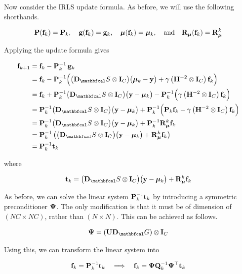 Now consider the IRLS update formula. As before, we will use the following shorthands. 

\begin{equation*}
    \mathbf{P}(\mathbf{f}_k) = \mathbf{P}_k, \quad \mathbf{g}(\mathbf{f}_k) = \mathbf{g}_k, \quad \boldsymbol{\mu}(\mathbf{f}_k) = \boldsymbol{\mu}_k, \quad \text{and} \quad \mathbf{R}_{\boldsymbol{\mu}}(\mathbf{f}_k) = \mathbf{R}_{\boldsymbol{\mu}}^k
\end{equation*}

Applying the update formula gives

\begin{align*}
    \f_{k+1} &= \f_k - \PP^{-1}_k \, \g_k\\
    &= \f_{k} - \PP^{-1}_k \Big(\big(\D_\St \otimes \I_C\big) \big(\muu_k - \y\big) + \gamma \left(\HH^{-2} \otimes \I_C\right) \f_k\Big) \\
    &= \f_k + \PP^{-1}_k \big(\D_\St \otimes \I_C\big) \big(\y - \muu_k\big) - \PP^{-1}_k \Big(\gamma \left(\HH^{-2} \otimes \I_C\right) \f_k\Big) \\
    &= \PP^{-1}_k \big(\D_\St \otimes \I_C\big) \big(\y - \muu_k \big) + \PP^{-1}_k \Big(\PP_k \f_k - \gamma \left(\HH^{-2} \otimes \I_C\right) \f_k\Big) \\
    &= \PP^{-1}_k \big(\D_\St \otimes \I_C\big) \big(\y - \muu_k \big) + \PP^{-1}_k \RR_{\muu}^k\f_k  \\
    &= \PP^{-1}_k \left(\big(\D_\St \otimes \I_C\big)\big(\y - \muu_k \big) + \RR_{\muu}^k\f_k \right) \\
    &= \PP^{-1}_k \tee_k
\end{align*}

where 

\begin{equation*}
    \tee_k = \big(\D_\St \otimes \I_C\big)\big(\y - \muu_k \big) + \RR_{\muu}^k\f_k
\end{equation*}

As before, we can solve the linear system $\mathbf{P}^{-1}_k \mathbf{t}_k$ by introducing a symmetric preconditioner $\mathbf{\Psi}$. The only modification is that it must be of dimension of $(NC \times NC)$, rather than $(N \times N)$. This can be achieved as follows. 

\begin{equation*}
    \PSI = \left(\U \D_\Gt\right) \otimes \I_C 
\end{equation*}

Using this, we can transform the linear system into 

\begin{equation*}
    \mathbf{f}_k = \mathbf{P}^{-1}_k \mathbf{t}_k \quad \Longrightarrow \quad \mathbf{f}_k = \mathbf{\Psi} \mathbf{Q}_k^{-1} \mathbf{\Psi}^\top \mathbf{t}_k
\end{equation*}

